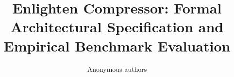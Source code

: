 \title{\textbf{Enlighten Compressor: Formal Architectural Specification and Empirical Benchmark Evaluation}}

\author{Anonymous authors}
